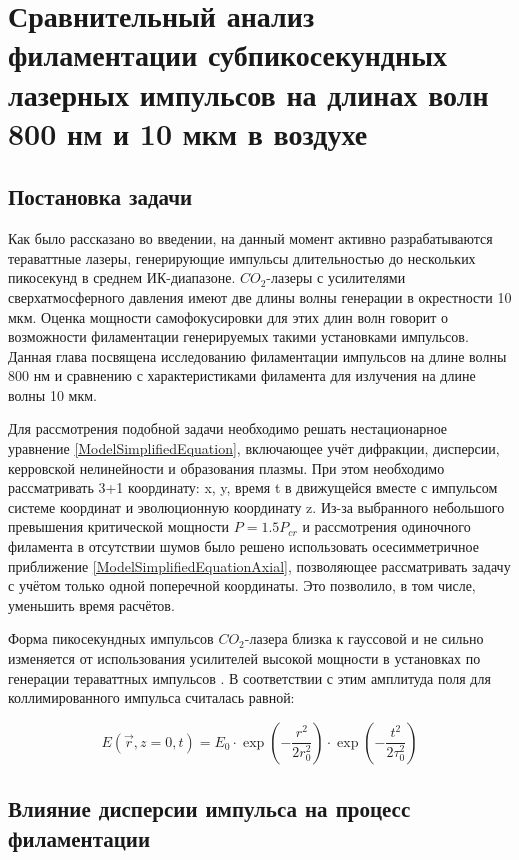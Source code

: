 \section{Сравнительный анализ филаментации субпикосекундных лазерных импульсов на длинах волн 800 нм и 10 мкм в воздухе}
\label{sec:pulses}

\subsection{Постановка задачи}

Как было рассказано во введении, на данный момент активно разрабатываются тераваттные лазеры,
генерирующие импульсы длительностью до нескольких пикосекунд в среднем ИК-диапазоне.
$CO_2$-лазеры с усилителями сверхатмосферного давления имеют две длины волны генерации в окрестности 10 мкм.
Оценка мощности самофокусировки для этих длин волн говорит о возможности филаментации
генерируемых такими установками импульсов. Данная глава посвящена исследованию филаментации
импульсов на длине волны 800 нм и сравнению с характеристиками филамента для излучения на длине волны 10 мкм.

Для рассмотрения подобной задачи необходимо решать нестационарное уравнение \ref{ModelSimplifiedEquation},
включающее учёт дифракции, дисперсии, керровской нелинейности и образования плазмы.
При этом необходимо рассматривать 3+1 координату: x, y, время t в движущейся вместе с импульсом системе координат
и эволюционную координату z. Из-за выбранного небольшого превышения критической мощности $P = 1.5 P_{cr}$
и рассмотрения одиночного филамента в отсутствии шумов было решено использовать осесимметричное приближение \ref{ModelSimplifiedEquationAxial},
позволяющее рассматривать задачу с учётом только одной поперечной координаты. Это позволило, в том числе, уменьшить время расчётов.

Форма пикосекундных импульсов $CO_2$-лазера близка к гауссовой и не сильно изменяется от использования
усилителей высокой мощности в установках по генерации тераваттных импульсов \cite{PicosecondAmplifier2007}.
В соответствии с этим амплитуда поля для коллимированного импульса считалась равной:

\begin{equation}\label{PulsesInitialConditions}
E(\vec{r}, z = 0, t) = E_0 \cdot \exp\left(-\frac{r^2}{2 r_0^2}\right) \cdot \exp\left(-\frac{t^2}{2 \tau_0^2}\right)
\end{equation}


\subsection{Влияние дисперсии импульса на процесс филаментации}

